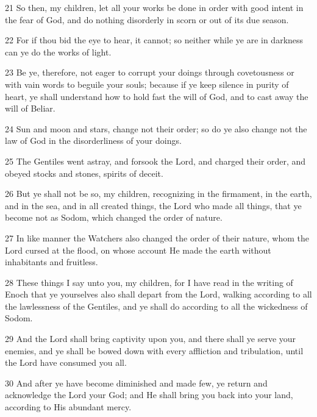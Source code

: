 \par 21 So then, my children, let all your works be done in order with good intent in the fear of God, and do nothing disorderly in scorn or out of its due season.

\par 22 For if thou bid the eye to hear, it cannot; so neither while ye are in darkness can ye do the works of light.

\par 23 Be ye, therefore, not eager to corrupt your doings through covetousness or with vain words to beguile your souls; because if ye keep silence in purity of heart, ye shall understand how to hold fast the will of God, and to cast away the will of Beliar.

\par 24 Sun and moon and stars, change not their order; so do ye also change not the law of God in the disorderliness of your doings.

\par 25 The Gentiles went astray, and forsook the Lord, and charged their order, and obeyed stocks and stones, spirits of deceit.

\par 26 But ye shall not be so, my children, recognizing in the firmament, in the earth, and in the sea, and in all created things, the Lord who made all things, that ye become not as Sodom, which changed the order of nature.

\par 27 In like manner the Watchers also changed the order of their nature, whom the Lord cursed at the flood, on whose account He made the earth without inhabitants and fruitless.

\par 28 These things I say unto you, my children, for I have read in the writing of Enoch that ye yourselves also shall depart from the Lord, walking according to all the lawlessness of the Gentiles, and ye shall do according to all the wickedness of Sodom.

\par 29 And the Lord shall bring captivity upon you, and there shall ye serve your enemies, and ye shall be bowed down with every affliction and tribulation, until the Lord have consumed you all.

\par 30 And after ye have become diminished and made few, ye return and acknowledge the Lord your God; and He shall bring you back into your land, according to His abundant mercy.

